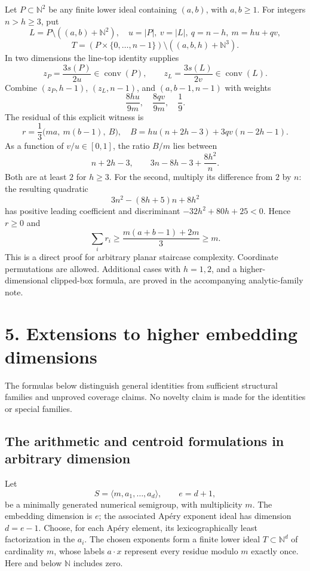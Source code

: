 \documentclass[
  11pt,
  a4paper,
]{article}
\let\oldsection\section
\renewcommand{\section}{\Needspace{7\baselineskip}\oldsection}
\begin{document}
Let \(P\subset\mathbb N^2\) be any finite lower ideal containing
\((a,b)\), with \(a,b\ge1\). For integers \(n>h\ge3\), put \[
L=P\setminus((a,b)+\mathbb N^2),\quad
u=|P|,\ v=|L|,\ q=n-h,\ m=hu+qv,
\] \[
T=(P\times\{0,\ldots,n-1\})\setminus((a,b,h)+\mathbb N^3).
\] In two dimensions the line-top identity supplies \[
z_P=\frac{3s(P)}{2u}\in\operatorname{conv}(P),\qquad
z_L=\frac{3s(L)}{2v}\in\operatorname{conv}(L).
\] Combine \((z_P,h-1)\), \((z_L,n-1)\), and \((a,b-1,n-1)\) with
weights \[
\frac{8hu}{9m},\quad\frac{8qv}{9m},\quad\frac19.
\] The residual of this explicit witness is \[
r=\frac13\big(ma,\ m(b-1),\ B\big),\quad
B=hu(n+2h-3)+3qv(n-2h-1).
\] As a function of \(v/u\in[0,1]\), the ratio \(B/m\) lies between \[
n+2h-3,\qquad 3n-8h-3+\frac{8h^2}{n}.
\] Both are at least \(2\) for \(h\ge3\). For the second, multiply its
difference from \(2\) by \(n\): the resulting quadratic \[
3n^2-(8h+5)n+8h^2
\] has positive leading coefficient and discriminant
\(-32h^2+80h+25<0\). Hence \(r\ge0\) and \[
\sum_i r_i\ge\frac{m(a+b-1)+2m}{3}\ge m.
\] This is a direct proof for arbitrary planar staircase complexity.
Coordinate permutations are allowed. Additional cases with \(h=1,2\),
and a higher-dimensional clipped-box formula, are proved in the
accompanying analytic-family note.

\hypertarget{extensions-to-higher-embedding-dimensions}{%
\section{5. Extensions to higher embedding
dimensions}\label{extensions-to-higher-embedding-dimensions}}

The formulas below distinguish general identities from sufficient
structural families and unproved coverage claims. No novelty claim is
made for the identities or special families.

\hypertarget{the-arithmetic-and-centroid-formulations-in-arbitrary-dimension}{%
\subsection{The arithmetic and centroid formulations in arbitrary
dimension}\label{the-arithmetic-and-centroid-formulations-in-arbitrary-dimension}}

Let \[
S=\langle m,a_1,\ldots,a_d\rangle,\qquad e=d+1,
\] be a minimally generated numerical semigroup, with multiplicity
\(m\). The embedding dimension is \(e\); the associated Apéry exponent
ideal has dimension \(d=e-1\). Choose, for each Apéry element, its
lexicographically least factorization in the \(a_i\). The chosen
exponents form a finite lower ideal \(T\subset\mathbb N^d\) of
cardinality \(m\), whose labels \(a\cdot x\) represent every residue
modulo \(m\) exactly once. Here and below \(\mathbb N\) includes zero.
\end{document}
